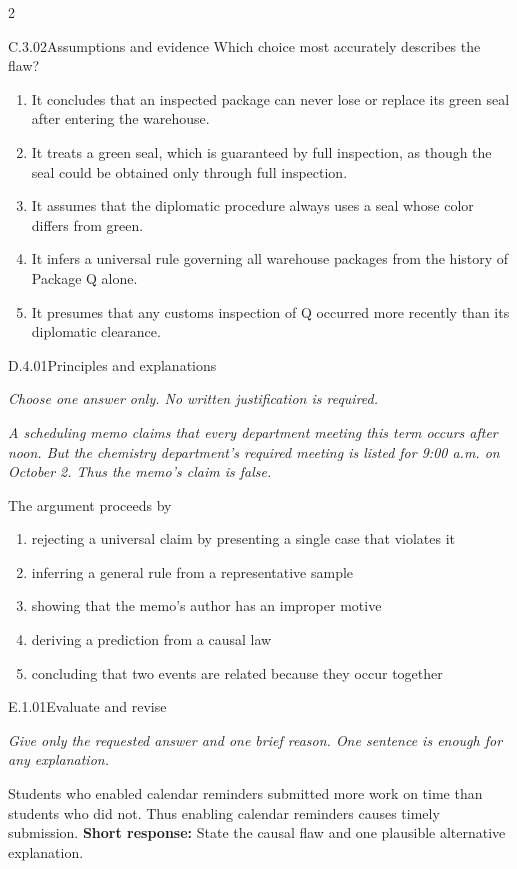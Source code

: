 \documentclass[9pt]{extarticle}
\newcommand{\choice}[1]{\item #1}
\begin{document}
\begin{multicols}{2}
\begin{DenseCoreProblem}{C.3.02}{Assumptions and evidence}
Which choice most accurately describes the flaw?
\begin{enumerate}[label=(\alph*)]
  \choice{It concludes that an inspected package can never lose or replace its green seal after entering the warehouse.}
  \choice{It treats a green seal, which is guaranteed by full inspection, as though the seal could be obtained only through full inspection.}
  \choice{It assumes that the diplomatic procedure always uses a seal whose color differs from green.}
  \choice{It infers a universal rule governing all warehouse packages from the history of Package Q alone.}
  \choice{It presumes that any customs inspection of Q occurred more recently than its diplomatic clearance.}
\end{enumerate}
\end{DenseCoreProblem}
\begin{DenseCoreProblem}{D.4.01}{Principles and explanations}
{\scriptsize\textit{Choose one answer only. No written justification is required.}\par}
\emph{A scheduling memo claims that every department meeting this term occurs after noon. But the chemistry department's required meeting is listed for 9:00 a.m. on October 2. Thus the memo's claim is false.}

The argument proceeds by
\begin{enumerate}[label=(\alph*)]
  \choice{rejecting a universal claim by presenting a single case that violates it}
  \choice{inferring a general rule from a representative sample}
  \choice{showing that the memo's author has an improper motive}
  \choice{deriving a prediction from a causal law}
  \choice{concluding that two events are related because they occur together}
\end{enumerate}
\end{DenseCoreProblem}
\begin{DenseCoreProblem}{E.1.01}{Evaluate and revise}
{\scriptsize\textit{Give only the requested answer and one brief reason. One sentence is enough for any explanation.}\par}
Students who enabled calendar reminders submitted more work on time than students who did not. Thus enabling calendar reminders causes timely submission.
\textbf{Short response:} State the causal flaw and one plausible alternative explanation.
\end{DenseCoreProblem}
\end{multicols}
\CoreWorkArea
\FormBreak
{}
\end{document}
